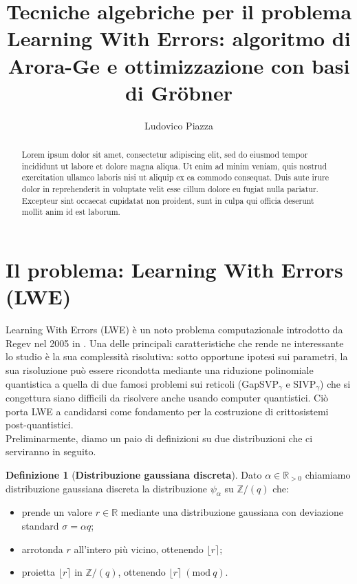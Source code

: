 \documentclass[a4paper]{article}
\title{Tecniche algebriche per il problema Learning With Errors: algoritmo di Arora-Ge e ottimizzazione con basi di Gröbner}
\author{Ludovico Piazza}
\theoremstyle{plain}
\theoremstyle{definition}
\newtheorem{definizione}{Definizione}[section]
\theoremstyle{remark}
\newcommand{\Z}{\mathbb{Z}}
\newcommand{\R}{\mathbb{R}}
\newcommand{\round}[1]{\ensuremath{\lfloor#1\rceil}}
\begin{document}
	\maketitle
	
	\begin{abstract}
		Lorem ipsum dolor sit amet, consectetur adipiscing elit, sed do eiusmod tempor incididunt ut labore et dolore magna aliqua. Ut enim ad minim veniam, quis nostrud exercitation ullamco laboris nisi ut aliquip ex ea commodo consequat. Duis aute irure dolor in reprehenderit in voluptate velit esse cillum dolore eu fugiat nulla pariatur. Excepteur sint occaecat cupidatat non proident, sunt in culpa qui officia deserunt mollit anim id est laborum.
	\end{abstract}
	
	\tableofcontents
	
	\newpage
	
	\section{Il problema: Learning With Errors (LWE)}
	Learning With Errors (LWE) è un noto problema computazionale introdotto da Regev nel 2005 in \cite{Reg05}. Una delle principali caratteristiche che rende ne interessante lo studio è la sua complessità risolutiva: sotto opportune ipotesi sui parametri, la sua risoluzione può essere ricondotta mediante una riduzione polinomiale quantistica a quella di due famosi problemi sui reticoli (GapSVP$_\gamma$ e SIVP$_\gamma$) che si congettura siano difficili da risolvere anche usando computer quantistici. Ciò porta LWE a candidarsi come fondamento per la costruzione di crittosistemi post-quantistici.\\
	
	Preliminarmente, diamo un paio di definizioni su due distribuzioni che ci serviranno in seguito.
	
	\begin{definizione}[\textbf{Distribuzione gaussiana discreta}]
		Dato $\alpha \in \R_{>0}$ chiamiamo distribuzione gaussiana discreta la distribuzione $\psi_\alpha$ su $\Z/(q)$ che:
		\begin{itemize}
			\item prende un valore $r\in\R$ mediante una distribuzione gaussiana con deviazione standard $\sigma=\alpha q$;
			\item arrotonda $r$ all'intero più vicino, ottenendo $\round{r}$;
			\item proietta $\round{r}$ in $\Z/(q)$, ottenendo $\round{r}~(\mathrm{mod}~q)$.
		\end{itemize} 
	\end{definizione}
	
\end{document}
